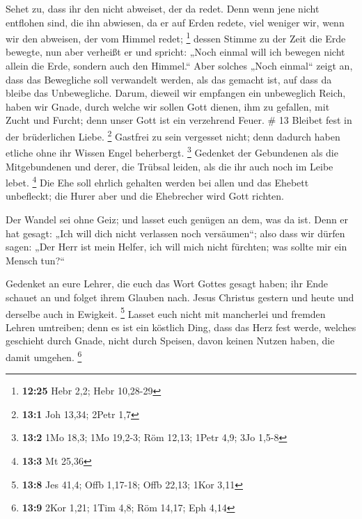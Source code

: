  Sehet zu, dass ihr den nicht abweiset, der da redet. Denn
wenn jene nicht entflohen sind, die ihn abwiesen, da er auf Erden
redete, viel weniger wir, wenn wir den abweisen, der vom Himmel redet;
\footnote{\textbf{12:25} Hebr 2,2; Hebr 10,28-29}  dessen
Stimme zu der Zeit die Erde bewegte, nun aber verheißt er und spricht:
„Noch einmal will ich bewegen nicht allein die Erde, sondern auch den
Himmel.``  Aber solches „Noch einmal`` zeigt an, dass das
Bewegliche soll verwandelt werden, als das gemacht ist, auf dass da
bleibe das Unbewegliche.  Darum, dieweil wir empfangen ein
unbeweglich Reich, haben wir Gnade, durch welche wir sollen Gott dienen,
ihm zu gefallen, mit Zucht und Furcht;  denn unser Gott ist
ein verzehrend Feuer. \# 13  Bleibet fest in der
brüderlichen Liebe. \footnote{\textbf{13:1} Joh 13,34; 2Petr 1,7}
 Gastfrei zu sein vergesset nicht; denn dadurch haben
etliche ohne ihr Wissen Engel beherbergt. \footnote{\textbf{13:2} 1Mo
  18,3; 1Mo 19,2-3; Röm 12,13; 1Petr 4,9; 3Jo 1,5-8} 
Gedenket der Gebundenen als die Mitgebundenen und derer, die Trübsal
leiden, als die ihr auch noch im Leibe lebet. \footnote{\textbf{13:3} Mt
  25,36}  Die Ehe soll ehrlich gehalten werden bei allen und
das Ehebett unbefleckt; die Hurer aber und die Ehebrecher wird Gott
richten.

 Der Wandel sei ohne Geiz; und lasset euch genügen an dem,
was da ist. Denn er hat gesagt: „Ich will dich nicht verlassen noch
versäumen``;  also dass wir dürfen sagen: „Der Herr ist mein
Helfer, ich will mich nicht fürchten; was sollte mir ein Mensch tun?{}``

 Gedenket an eure Lehrer, die euch das Wort Gottes gesagt
haben; ihr Ende schauet an und folget ihrem Glauben nach. 
Jesus Christus gestern und heute und derselbe auch in Ewigkeit.
\footnote{\textbf{13:8} Jes 41,4; Offb 1,17-18; Offb 22,13; 1Kor 3,11}
 Lasset euch nicht mit mancherlei und fremden Lehren
umtreiben; denn es ist ein köstlich Ding, dass das Herz fest werde,
welches geschieht durch Gnade, nicht durch Speisen, davon keinen Nutzen
haben, die damit umgehen. \footnote{\textbf{13:9} 2Kor 1,21; 1Tim 4,8;
  Röm 14,17; Eph 4,14}

